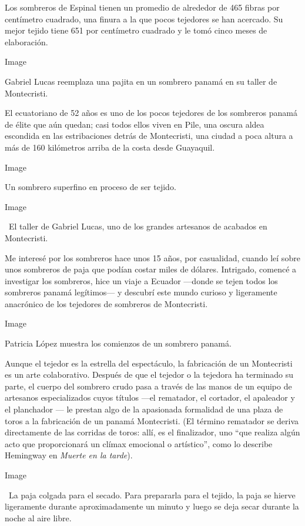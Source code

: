 Los sombreros de Espinal tienen un promedio de alrededor de 465 fibras
por centímetro cuadrado, una finura a la que pocos tejedores se han
acercado. Su mejor tejido tiene 651 por centímetro cuadrado y le tomó
cinco meses de elaboración.

Image

Gabriel Lucas reemplaza una pajita en un sombrero panamá en su taller de
Montecristi.

El ecuatoriano de 52 años es uno de los pocos tejedores de los sombreros
panamá de élite que aún quedan; casi todos ellos viven en Pile, una
oscura aldea escondida en las estribaciones detrás de Montecristi, una
ciudad a poca altura a más de 160 kilómetros arriba de la costa desde
Guayaquil.

Image

Un sombrero superfino en proceso de ser tejido.

Image

~El taller de Gabriel Lucas, uno de los grandes artesanos de acabados en
Montecristi.

Me interesé por los sombreros hace unos 15 años, por casualidad, cuando
leí sobre unos sombreros de paja que podían costar miles de dólares.
Intrigado, comencé a investigar los sombreros, hice un viaje a Ecuador
---donde se tejen todos los sombreros panamá legítimos--- y descubrí
este mundo curioso y ligeramente anacrónico de los tejedores de
sombreros de Montecristi.

Image

Patricia López muestra los comienzos de un sombrero panamá.

Aunque el tejedor es la estrella del espectáculo, la fabricación de un
Montecristi es un arte colaborativo. Después de que el tejedor o la
tejedora ha terminado su parte, el cuerpo del sombrero crudo pasa a
través de las manos de un equipo de artesanos especializados cuyos
títulos ---el rematador, el cortador, el apaleador y el planchador ---
le prestan algo de la apasionada formalidad de una plaza de toros a la
fabricación de un panamá Montecristi. (El término rematador se deriva
directamente de las corridas de toros: allí, es el finalizador, uno
``que realiza algún acto que proporcionará un clímax emocional o
artístico'', como lo describe Hemingway en \emph{Muerte en la tarde}).

Image

~La paja colgada para el secado. Para prepararla para el tejido, la paja
se hierve ligeramente durante aproximadamente un minuto y luego se deja
secar durante la noche al aire libre.

